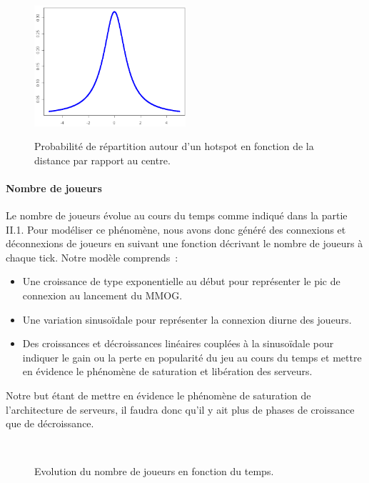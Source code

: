 \begin{figure}[h!]
	\centering
	\includegraphics[width=0.5\textwidth]{cauchy.png}
	\\[0.2cm]
	\caption{Probabilité de répartition autour d'un hotspot en fonction de la distance par rapport au centre.}
	\label{fig:repartition}
\end{figure}

\paragraph{Nombre de joueurs\\}

Le nombre de joueurs évolue au cours du temps comme indiqué dans la partie II.1.
Pour modéliser ce phénomène, nous avons donc généré des connexions et déconnexions de joueurs en suivant une fonction décrivant le nombre de joueurs à chaque tick.
Notre modèle comprends~:

\begin{itemize}
\item Une croissance de type exponentielle au début pour représenter le pic de connexion au lancement du MMOG.
\item Une variation sinusoïdale pour représenter la connexion diurne des joueurs.
\item Des croissances et décroissances linéaires couplées à la sinusoïdale pour indiquer le gain ou la perte en popularité du jeu au cours du temps et mettre en évidence le phénomène de saturation et libération des serveurs.
\end{itemize}

Notre but étant de mettre en évidence le phénomène de saturation de l'architecture de serveurs, il faudra donc qu'il y ait plus de phases de croissance que de décroissance.

\begin{figure}[h!]
	\centering
	\\[0.2cm]
	\caption{Evolution du nombre de joueurs en fonction du temps.}
	\label{fig:nbre_joueurs}
\end{figure}

